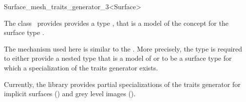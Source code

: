 

\begin{ccRefClass}{Surface_mesh_traits_generator_3<Surface>}  %


\ccDefinition
  
The class \ccRefName\ provides 
provides a type  , that is 
a model of the concept 
for the surface type .

The mechanism used here is similar to the
. 
More precisely, the type  is required to 
either provide a nested type
that is a model of 
or to be a surface type for which a specialization
of the traits generator \ccRefName exists.
 

Currently, the library provides partial specializations
of  the   traits generator 
for implicit surfaces () and 
grey level images ().
 






\ccSeeAlso

  





\end{ccRefClass}


